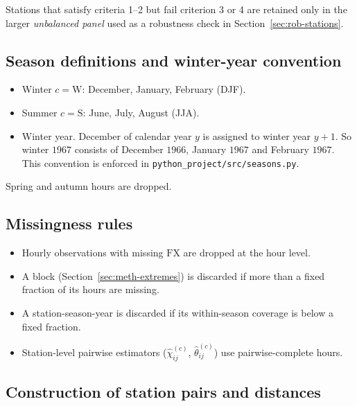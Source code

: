 Stations that satisfy criteria 1--2 but fail criterion 3 or 4 are
retained only in the larger \emph{unbalanced panel} used as a
robustness check in Section~\ref{sec:rob-stations}.

\subsection{Season definitions and winter-year
convention}\label{sec:emp-seasons}

\begin{itemize}
    \item Winter \(c = \mathrm{W}\): December, January, February
          (DJF).
    \item Summer \(c = \mathrm{S}\): June, July, August (JJA).
    \item Winter year. December of calendar year \(y\) is assigned
          to winter year \(y+1\). So winter \(1967\) consists of
          December \(1966\), January \(1967\) and February
          \(1967\). This convention is enforced in
          \texttt{python\_project/src/seasons.py}.
\end{itemize}

Spring and autumn hours are dropped.

\subsection{Missingness rules}\label{sec:emp-missing}

\begin{itemize}
    \item Hourly observations with missing \(\mathrm{FX}\) are
          dropped at the hour level.
    \item A block (Section~\ref{sec:meth-extremes}) is discarded
          if more than a fixed fraction of its hours are missing.
    \item A station-season-year is discarded if its within-season
          coverage is below a fixed fraction.
    \item Station-level pairwise estimators
          (\(\widehat\chi_{ij}^{(c)}\), \(\widehat\theta_{ij}^{(c)}\))
          use pairwise-complete hours.
\end{itemize}

\subsection{Construction of station pairs and
distances}\label{sec:emp-pairs}


